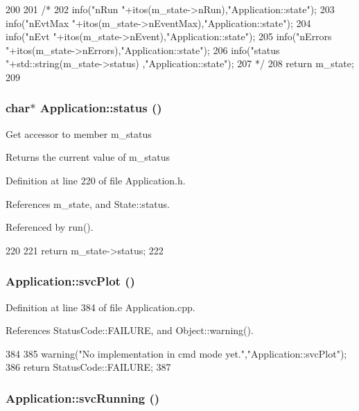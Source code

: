 \begin{DoxyCode}
200                             {
201   /*
202     info("nRun    "+itos(m_state->nRun),"Application::state");
203     info("nEvtMax "+itos(m_state->nEventMax),"Application::state");
204     info("nEvt    "+itos(m_state->nEvent),"Application::state");
205     info("nErrors "+itos(m_state->nErrors),"Application::state");
206     info("status  "+std::string(m_state->status) ,"Application::state");
207   */
208   return m_state;
209 }
\end{DoxyCode}
\hypertarget{classApplication_ad429c4d2322f706e3564c1ee05d38ff1}{
\subsubsection[{status}]{\setlength{\rightskip}{0pt plus 5cm}char$\ast$ Application::status ()}}
\label{classApplication_ad429c4d2322f706e3564c1ee05d38ff1}
Get accessor to member m\_\-status \begin{DoxyReturn}{Returns}
the current value of m\_\-status 
\end{DoxyReturn}


Definition at line 220 of file Application.h.

References m\_\-state, and State::status.

Referenced by run().


\begin{DoxyCode}
220                   {
221     return m_state->status;
222   }
\end{DoxyCode}
\hypertarget{classApplication_a297f55c288c32cbdadadcbbc26ae7692}{
\subsubsection[{svcPlot}]{ Application::svcPlot ()}}
\label{classApplication_a297f55c288c32cbdadadcbbc26ae7692}


Definition at line 384 of file Application.cpp.

References StatusCode::FAILURE, and Object::warning().


\begin{DoxyCode}
384                                   {
385   warning("No implementation in cmd mode yet.","Application::svcPlot");
386   return StatusCode::FAILURE;
387 }
\end{DoxyCode}
\hypertarget{classApplication_a35eca6b5e618b508a0736d032e2a9203}{
\subsubsection[{svcRunning}]{ Application::svcRunning ()}}
\label{classApplication_a35eca6b5e618b508a0736d032e2a9203}


